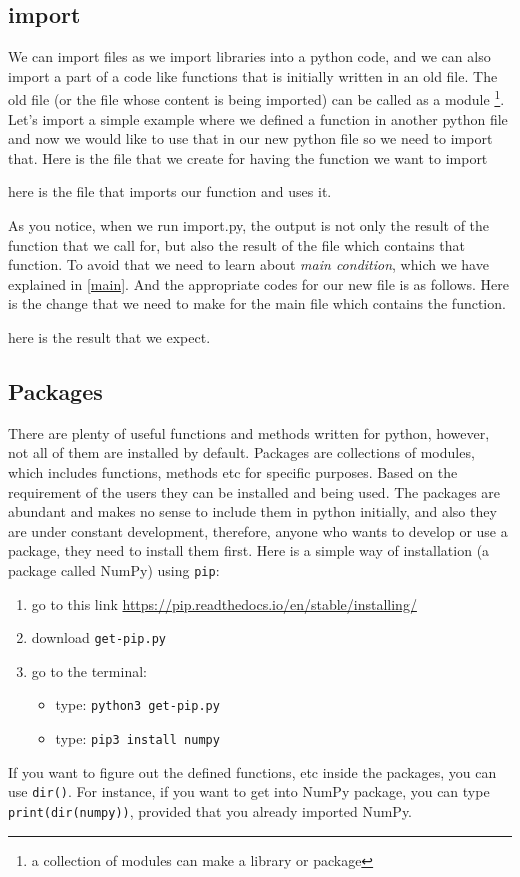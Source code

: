 \documentclass[10pt,a4paper]{article}
\begin{document}
\subsection{import}
We can import files as we import libraries into a python code, and we can also import a part of a code like functions that is initially written in an old file. The old file (or the file whose  content is being imported) can be called as a module \footnote{a collection of modules can make a library or package}. Let's import a simple example where we defined a function in another python file and now we would like to use that in our new python file so we need to import that. Here is the file that we create for having the function we want to import

here is the file that imports our function and uses it.

As you notice, when we run import.py, the output is not only the result of the function that we call for, but also the result of the file which contains that function. To avoid that we need to learn about \textit{main condition}, which we have explained in \ref{main}. And the appropriate codes for our new file is as follows.
Here is the change that we need to make for the main file which contains the function.

here is the result that we expect.


\subsection{Packages}

There are plenty of useful functions and methods written for python, however, not all of them are installed by default. Packages are collections of modules, which includes functions, methods etc for specific purposes.  Based on the requirement of the users they can be installed and being used. The packages are abundant and makes no sense to include them in python initially, and also they are under constant development, therefore, anyone who wants to develop or use a package, they need to install them first. Here is a simple way of installation (a package called NumPy)  using \texttt{pip}:
\begin{enumerate}
\item go to this link \href{https://pip.readthedocs.io/en/stable/installing/}{https://pip.readthedocs.io/en/stable/installing/}
\item download \texttt{get-pip.py}
\item go to the terminal:
\begin{itemize}
\item type: \texttt{python3 get-pip.py}
\item type: \texttt{pip3 install numpy}
\end{itemize}
\end{enumerate}
If you want to figure out the defined functions, etc inside the packages, you can use \texttt{dir()}. For instance, if you want to get into NumPy package, you can type \texttt{print(dir(numpy))}, provided that you already imported NumPy. 
\end{document}
